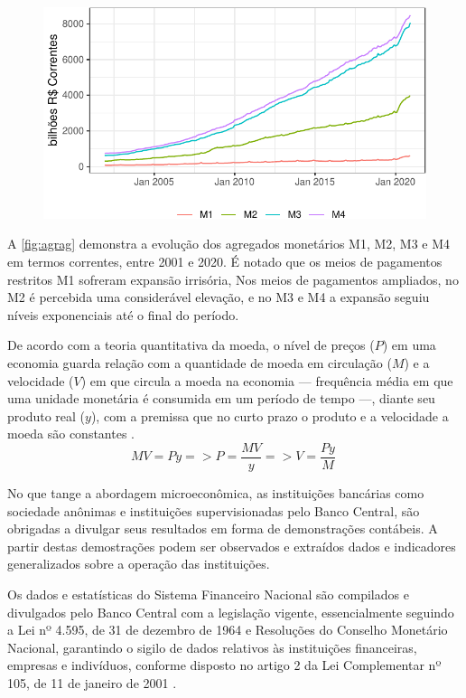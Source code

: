 \documentclass[12pt,12pt,openright,oneside,a4paper,chapter=TITLE,section=TITLE,subsection=TITLE,subsubsection=TITLE,english,french,spanish,portugues,sumario=tradicional]{abntex2}
\begin{document}
\begin{figure}

\begin{center}\includegraphics{12-exportedfigures/m2m3m4-1} \end{center}
\label{fig:agrag}
\end{figure}

A \autoref{fig:agrag} demonstra a evolução dos agregados monetários M1, M2, M3 e M4 em termos correntes, entre 2001 e 2020. É notado que os meios de pagamentos restritos M1 sofreram expansão irrisória, Nos meios de pagamentos ampliados, no M2 é percebida uma considerável elevação, e no M3 e M4 a expansão seguiu níveis exponenciais até o final do período.

De acordo com a teoria quantitativa da moeda, o nível de preços (\(P\)) em uma economia guarda relação com a quantidade de moeda em circulação (\(M\)) e a velocidade (\(V\)) em que circula a moeda na economia --- frequência média em que uma unidade monetária é consumida em um período de tempo ---, diante seu produto real (\(y\)), com a premissa que no curto prazo o produto e a velocidade a moeda são constantes \cite{vasconcellos:2011}.
\[
MV = Py => P = \frac{MV}{y} => V = \frac{Py}{M}\
\]

No que tange a abordagem microeconômica, as instituições bancárias como sociedade anônimas e instituições supervisionadas pelo Banco Central, são obrigadas a divulgar seus resultados em forma de demonstrações contábeis. A partir destas demostrações podem ser observados e extraídos dados e indicadores generalizados sobre a operação das instituições.

Os dados e estatísticas do Sistema Financeiro Nacional são compilados e divulgados pelo Banco Central com a legislação vigente, essencialmente seguindo a Lei nº 4.595, de 31 de dezembro de 1964 e Resoluções do Conselho Monetário Nacional, garantindo o sigilo de dados relativos às instituições financeiras, empresas e indivíduos, conforme disposto no artigo 2 da Lei Complementar nº 105, de 11 de janeiro de 2001 \cite{sgs:bm}.
\end{document}
